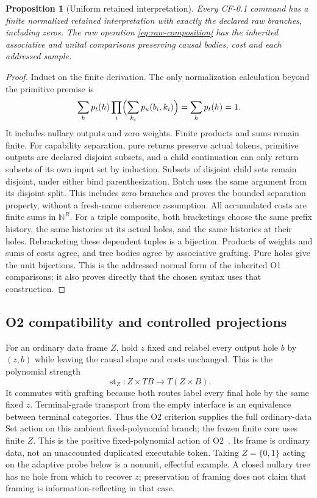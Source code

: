 \documentclass[11pt,a4paper]{article}
\newtheorem{proposition}[theorem]{Proposition}
\theoremstyle{definition}
\begin{document}
\begin{proposition}[Uniform retained interpretation]\label{prop:retained}
Every CF-0.1 command has a finite normalized retained interpretation with
exactly the declared raw branches, including zeros. The raw operation
\eqref{eq:raw-composition} has the inherited associative and unital
comparisons preserving causal bodies, cost and each addressed sample.
\end{proposition}
\begin{proof}
Induct on the finite derivation. The only normalization calculation beyond
the primitive premise is
\[
 \sum_h p_t(h)\prod_i\Bigl(\sum_{k_i}p_u(b_i,k_i)\Bigr)
 =\sum_h p_t(h)=1.
\]
It includes nullary outputs and zero weights. Finite products and sums
remain finite. For capability separation, pure returns preserve actual
tokens, primitive outputs are declared disjoint subsets, and a child
continuation can only return subsets of its own input set by induction.
Subsets of disjoint child sets remain disjoint, under either bind
parenthesization. Batch uses the same argument from its disjoint split.
This includes zero branches and proves the bounded separation property,
without a fresh-name coherence assumption. All accumulated costs
are finite sums in $\mathbb N^R$. For a triple composite, both bracketings
choose the same prefix history, the same histories at its actual holes,
and the same histories at their holes. Rebracketing these dependent tuples
is a bijection. Products of weights and sums of costs agree, and tree
bodies agree by associative grafting. Pure holes give the unit bijections.
This is the addressed normal form of the inherited O1 comparisons; it
also proves directly that the chosen syntax uses that construction.
\end{proof}

\subsection{O2 compatibility and controlled projections}
For an ordinary data frame $Z$, hold $z$ fixed and relabel every output
hole $b$ by $(z,b)$ while leaving the causal shape and costs unchanged.
This is the polynomial strength
\[
 \operatorname{st}_Z:Z\times TB\longrightarrow T(Z\times B).
\]
It commutes with grafting because both routes label every final hole by
the same fixed $z$. Terminal-grade transport from the empty interface is an equivalence
between terminal categories. Thus the O2 criterion supplies the full
ordinary-data Set action on this ambient fixed-polynomial branch; the
frozen finite core uses finite $Z$. This is the positive
fixed-polynomial action of O2~\cite{O2}. Its frame is ordinary data, not
an unaccounted duplicated executable token. Taking $Z=\{0,1\}$ acting on
the adaptive probe below is a nonunit, effectful example. A closed nullary
tree has no hole from which to recover $z$; preservation of framing does
not claim that framing is information-reflecting in that case.
\end{document}
